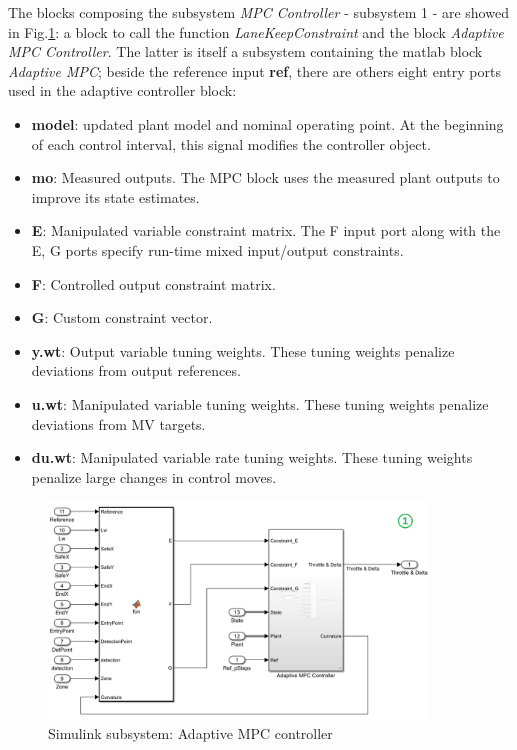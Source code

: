  The blocks composing the subsystem \textit{MPC Controller} - subsystem 1 - are showed in Fig.\ref{fig:simulink_mpc}: a block to call the function \textit{LaneKeepConstraint} and the block \textit{Adaptive MPC Controller}. The latter is itself a subsystem containing the matlab block \textit{Adaptive MPC}; beside the reference input \textbf{ref}, there are others eight entry ports used in the adaptive controller block:
 \begin{itemize}
     \item \textbf{model}: updated plant model and nominal operating point. At the beginning of each control interval, this signal modifies the controller object.
     \item \textbf{mo}: Measured outputs. The MPC block uses the measured plant outputs to improve its state estimates.
     \item \textbf{E}: Manipulated variable constraint matrix. The F input port along with the E, G ports specify run-time mixed input/output constraints.
     \item \textbf{F}: Controlled output constraint matrix.
     \item \textbf{G}: Custom constraint vector.
     \item \textbf{y.wt}: Output variable tuning weights. These tuning weights penalize deviations from output references.
     \item \textbf{u.wt}: Manipulated variable tuning weights.  These tuning weights penalize deviations from MV targets.
     \item \textbf{du.wt}: Manipulated variable rate tuning weights. These tuning weights penalize large changes in control moves.
 \end{itemize}     
\begin{figure}[H]
    \centering
    \includegraphics[width=0.9\textwidth]{Figures/simulink_mpc.png}
    \caption{Simulink subsystem: Adaptive MPC controller}
    \label{fig:simulink_mpc}
\end{figure}


